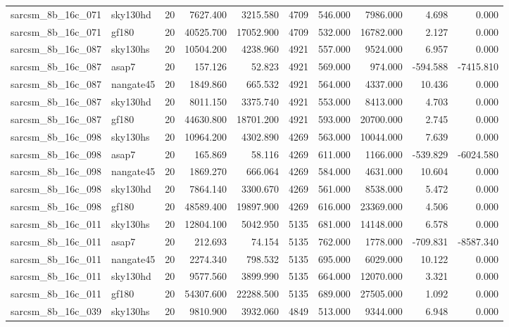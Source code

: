 \begin{tabular}{llrrrrrrrr}
sarcsm\_8b\_16c\_071 & sky130hd & 20 & 7627.400 & 3215.580 & 4709 & 546.000 & 7986.000 & 4.698 & 0.000 \\
sarcsm\_8b\_16c\_071 & gf180 & 20 & 40525.700 & 17052.900 & 4709 & 532.000 & 16782.000 & 2.127 & 0.000 \\
sarcsm\_8b\_16c\_087 & sky130hs & 20 & 10504.200 & 4238.960 & 4921 & 557.000 & 9524.000 & 6.957 & 0.000 \\
sarcsm\_8b\_16c\_087 & asap7 & 20 & 157.126 & 52.823 & 4921 & 569.000 & 974.000 & -594.588 & -7415.810 \\
sarcsm\_8b\_16c\_087 & nangate45 & 20 & 1849.860 & 665.532 & 4921 & 564.000 & 4337.000 & 10.436 & 0.000 \\
sarcsm\_8b\_16c\_087 & sky130hd & 20 & 8011.150 & 3375.740 & 4921 & 553.000 & 8413.000 & 4.703 & 0.000 \\
sarcsm\_8b\_16c\_087 & gf180 & 20 & 44630.800 & 18701.200 & 4921 & 593.000 & 20700.000 & 2.745 & 0.000 \\
sarcsm\_8b\_16c\_098 & sky130hs & 20 & 10964.200 & 4302.890 & 4269 & 563.000 & 10044.000 & 7.639 & 0.000 \\
sarcsm\_8b\_16c\_098 & asap7 & 20 & 165.869 & 58.116 & 4269 & 611.000 & 1166.000 & -539.829 & -6024.580 \\
sarcsm\_8b\_16c\_098 & nangate45 & 20 & 1869.270 & 666.064 & 4269 & 584.000 & 4631.000 & 10.604 & 0.000 \\
sarcsm\_8b\_16c\_098 & sky130hd & 20 & 7864.140 & 3300.670 & 4269 & 561.000 & 8538.000 & 5.472 & 0.000 \\
sarcsm\_8b\_16c\_098 & gf180 & 20 & 48589.400 & 19897.900 & 4269 & 616.000 & 23369.000 & 4.506 & 0.000 \\
sarcsm\_8b\_16c\_011 & sky130hs & 20 & 12804.100 & 5042.950 & 5135 & 681.000 & 14148.000 & 6.578 & 0.000 \\
sarcsm\_8b\_16c\_011 & asap7 & 20 & 212.693 & 74.154 & 5135 & 762.000 & 1778.000 & -709.831 & -8587.340 \\
sarcsm\_8b\_16c\_011 & nangate45 & 20 & 2274.340 & 798.532 & 5135 & 695.000 & 6029.000 & 10.122 & 0.000 \\
sarcsm\_8b\_16c\_011 & sky130hd & 20 & 9577.560 & 3899.990 & 5135 & 664.000 & 12070.000 & 3.321 & 0.000 \\
sarcsm\_8b\_16c\_011 & gf180 & 20 & 54307.600 & 22288.500 & 5135 & 689.000 & 27505.000 & 1.092 & 0.000 \\
sarcsm\_8b\_16c\_039 & sky130hs & 20 & 9810.900 & 3932.060 & 4849 & 513.000 & 9344.000 & 6.948 & 0.000 \\

\end{tabular}
